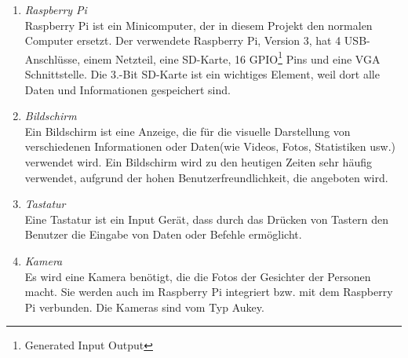 \begin{enumerate}
	\item \textit{Raspberry Pi} \\
	Raspberry Pi ist ein Minicomputer, der in diesem Projekt den normalen Computer ersetzt. Der verwendete Raspberry Pi, Version 3, hat 4 USB-Anschlüsse, einem Netzteil, eine SD-Karte, 16 GPIO\footnote{Generated Input Output} Pins und eine VGA Schnittstelle. Die 3.-Bit SD-Karte ist ein wichtiges Element, weil dort alle Daten und Informationen gespeichert sind.
	\item \textit{Bildschirm} \\
	Ein Bildschirm ist eine Anzeige, die für die visuelle Darstellung von verschiedenen Informationen oder Daten(wie Videos, Fotos, Statistiken usw.) verwendet wird. Ein Bildschirm wird zu den heutigen Zeiten sehr häufig verwendet, aufgrund der hohen Benutzerfreundlichkeit, die angeboten wird.\cite{Bildschirm}
	\item \textit{Tastatur} \\
	Eine Tastatur ist ein Input Gerät, dass durch das Drücken von Tastern den Benutzer die Eingabe von Daten oder Befehle ermöglicht.\cite{Tastatur}
	\item \textit{Kamera} \\
	Es wird eine Kamera benötigt, die die Fotos der Gesichter der Personen macht. Sie werden auch im Raspberry Pi integriert bzw. mit dem Raspberry Pi verbunden. Die Kameras sind vom Typ Aukey.
\end{enumerate}
